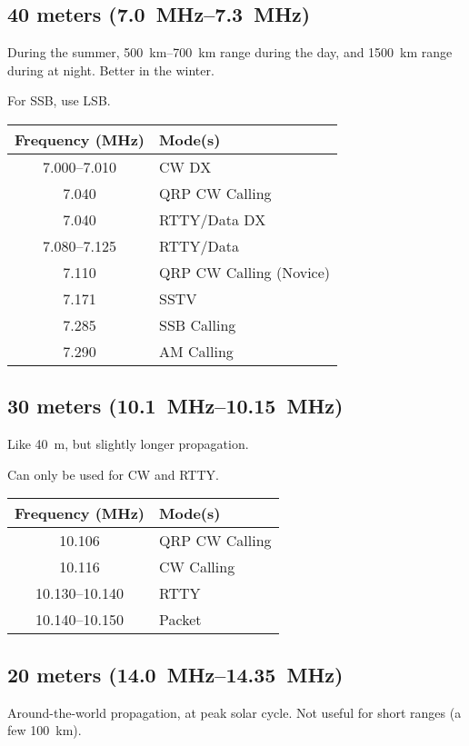 \documentclass[11pt, onecolumn, table]{article}
\begin{document}
\subsection{40 meters (\SIrange{7.0}{7.3}{\MHz})}
During the summer, \SIrange{500}{700}{\km} range during the day,
and \SI{1500}{\km} range during at night. Better in the winter.

For SSB, use LSB.
\begin{center}
  \begin{tabular}{S l}
    {Frequency (\si{\MHz})}	& Mode(s)					\\
    \midrule
    \numrange{7.000}{7.010}	& CW DX						\\
    \num{7.040}				& QRP CW Calling			\\
    \num{7.040}				& RTTY/Data DX				\\
    \numrange{7.080}{7.125}	& RTTY/Data					\\
    \num{7.110}				& QRP CW Calling (Novice)	\\
    \num{7.171}				& SSTV						\\
    \num{7.285}				& SSB Calling				\\
    \num{7.290}				& AM Calling				\\
  \end{tabular}
\end{center}


\subsection{30 meters (\SIrange{10.1}{10.15}{\MHz})}
Like \SI{40}{m}, but slightly longer propagation.

Can only be used for CW and RTTY.
\begin{center}
  \begin{tabular}{S l}
    {Frequency (\si{\MHz})}		& Mode(s)			\\
    \midrule
    \num{10.106}				& QRP CW Calling	\\
    \num{10.116}				& CW Calling		\\
    \numrange{10.130}{10.140}	& RTTY				\\
    \numrange{10.140}{10.150}	& Packet			\\
  \end{tabular}
\end{center}


\subsection{20 meters (\SIrange{14.0}{14.35}{\MHz})}
Around-the-world propagation, at peak solar cycle. Not
useful for short ranges (a few \SI{100}{\km}).
\end{document}
